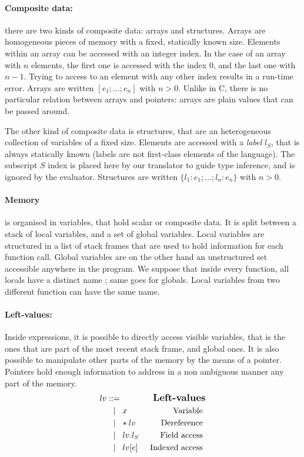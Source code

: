 \paragraph{Composite data:} there are two kinds of composite data: arrays and
structures. Arrays are homogeneous pieces of memory with a fixed, statically
known size. Elements within an array can be accessed with an integer
index.
In the case of an array with $n$ elements,
the first one is accessed with the index $0$,
and the last one with $n-1$.
Trying to access to an element
with any other index results in a run-time error.
Arrays are written $[ e_1; …; e_n ]$ with $n>0$. Unlike in C, there is no
particular relation between arrays and pointers: arrays are plain values that
can be passed around.

The other kind of composite data is structures, that are an heterogeneous
collection of variables of a fixed size. Elements are accessed with a
\emph{label} $l_S$, that is always statically known (labels are not first-class
elements of the language). The subscript $S$ index is placed here by our
translator to guide type inference, and is ignored by the evaluator. Structures
are written $\{ l_1 : e_1 ; … ; l_n : e_n \}$ with $n>0$.

\paragraph{Memory} is organised in variables, that hold scalar or composite
data. It is split between a stack of local variables, and a set of global
variables. Local variables are structured in a list of stack frames that are
used to hold information for each function call. Global variables are on the
other hand an unstructured set accessible anywhere in the program. We suppose
that inside every function, all locals have a distinct name ; same goes for
globals. Local variables from two different function can have the same name.

\paragraph{Left-values:} Inside expressions, it is possible to directly access
visible variables, that is the ones that are part of the most recent stack
frame, and global ones. It is also possible to manipulate other parts of the
memory by the means of a pointer. Pointers hold enough information
to address in a non ambiguous manner any part of the memory.%
{\small \begin{align*}
  \gramdefshort{Left-values}{lv}
                  { x      }{ Variable }
                  { \hspace{-2pt}*lv    }{ Dereference }
                  { lv.l_S }{ Field access }
                  { lv[e]  }{ Indexed access }
                  {END}
\end{align*}}%
